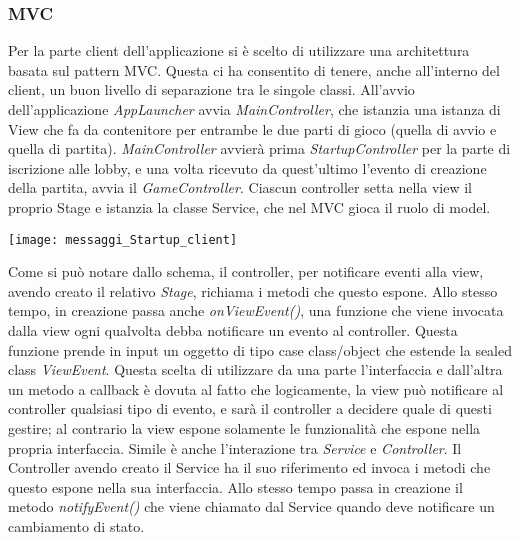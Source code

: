 \subsubsection{MVC}
Per la parte client dell’applicazione si è scelto di utilizzare una architettura basata sul pattern MVC\@.
Questa ci ha consentito di tenere, anche all’interno del client, un buon livello di separazione tra le singole classi.
\newline
All’avvio dell’applicazione \textit{AppLauncher} avvia \textit{MainController}, che istanzia una istanza di View che fa da contenitore per entrambe le due parti di gioco (quella di avvio e quella di partita).
\textit{MainController} avvierà prima \textit{StartupController} per la parte di iscrizione alle lobby, e una volta ricevuto da quest’ultimo l'evento di creazione della partita, avvia il \textit{GameController}.
Ciascun controller setta nella view il proprio Stage e istanzia la classe Service, che nel MVC gioca il ruolo di model.
\begin{center}
    \texttt{[image: messaggi\_Startup\_client]}
\end{center}
Come si può notare dallo schema, il controller, per notificare eventi alla view, avendo creato il relativo \textit{Stage}, richiama i metodi che questo espone.
\newline
Allo stesso tempo, in creazione passa anche \textit{onViewEvent()}, una funzione che viene invocata dalla view ogni qualvolta debba notificare un evento al controller. 
Questa funzione prende in input un oggetto di tipo case class/object che estende la sealed class \textit{ViewEvent}.\newline
Questa scelta di utilizzare da una parte l’interfaccia e dall’altra un metodo a callback è dovuta al fatto che logicamente, la view può notificare al controller qualsiasi tipo di evento, e sarà il controller a decidere quale di questi gestire; al contrario la view espone solamente le funzionalità che espone nella propria interfaccia.
\newline \newline
Simile è anche l’interazione tra \textit{Service} e \textit{Controller}. Il Controller avendo creato il Service ha il suo riferimento ed invoca i metodi che questo espone nella sua interfaccia. Allo stesso tempo passa in creazione il metodo \textit{notifyEvent()} che viene chiamato dal Service quando deve notificare un cambiamento di stato.

